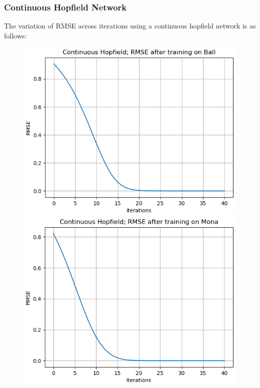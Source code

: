 \documentclass[12pt,a4paper]{article}
\begin{document}
\subsubsection{Continuous Hopfield Network}
The variation of RMSE across iterations using a continuous hopfield network is as follows:
\begin{figure}[H]
\centering
\includegraphics[scale=0.45]{images/chn_0_ball.png}
\includegraphics[scale=0.45]{images/chn_0_mona.png}

\end{figure}
\end{document}
